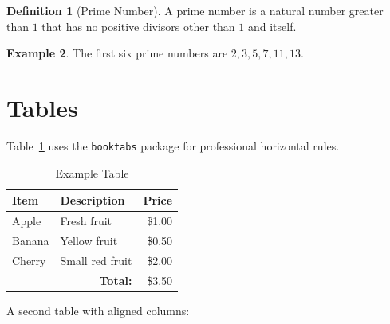 \documentclass[11pt]{article}
\theoremstyle{definition}
\newtheorem{definition}{Definition}[section]
\newtheorem{example}[definition]{Example}
\theoremstyle{plain}
\begin{document}
\begin{definition}[Prime Number]
    \label{def:prime}
    A prime number is a natural number greater than $1$ that has no
    positive divisors other than $1$ and itself.
\end{definition}

\begin{example}
    \label{ex:primes}
    The first six prime numbers are $2, 3, 5, 7, 11, 13$.
\end{example}

\section{Tables}
\label{sec:tables}

Table~\ref{tab:fruits} uses the \texttt{booktabs} package for
professional horizontal rules.

\begin{table}[H]
    \centering
    \caption{Example Table}
    \label{tab:fruits}
    \begin{tabular}{llr}
        \toprule
        \textbf{Item} & \textbf{Description} & \textbf{Price} \\
        \midrule
        Apple  & Fresh fruit      & \$1.00 \\
        Banana & Yellow fruit     & \$0.50 \\
        Cherry & Small red fruit  & \$2.00 \\
        \midrule
        \multicolumn{2}{r}{\textbf{Total:}} & \$3.50 \\
        \bottomrule
    \end{tabular}
\end{table}

A second table with aligned columns:
\end{document}
